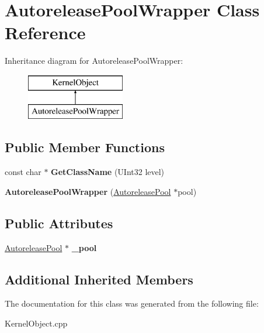 \hypertarget{class_autorelease_pool_wrapper}{}\section{Autorelease\+Pool\+Wrapper Class Reference}
\label{class_autorelease_pool_wrapper}
Inheritance diagram for Autorelease\+Pool\+Wrapper\+:\begin{figure}[H]
\begin{center}
\leavevmode
\includegraphics[height=2.000000cm]{class_autorelease_pool_wrapper}
\end{center}
\end{figure}
\subsection*{Public Member Functions}
\begin{DoxyCompactItemize}
\item 
\mbox{\label{class_autorelease_pool_wrapper_a86606ece5fe2c12375f38b61c9dcd269}} 
const char $\ast$ {\bfseries Get\+Class\+Name} (U\+Int32 level)
\item 
\mbox{\label{class_autorelease_pool_wrapper_af78d131c8973ae5aae7e6ef1d6d91b4c}} 
{\bfseries Autorelease\+Pool\+Wrapper} (\hyperlink{class_autorelease_pool}{Autorelease\+Pool} $\ast$pool)
\end{DoxyCompactItemize}
\subsection*{Public Attributes}
\begin{DoxyCompactItemize}
\item 
\mbox{\label{class_autorelease_pool_wrapper_a3ab16bc786d4319afbb09817b3d15a1c}} 
\hyperlink{class_autorelease_pool}{Autorelease\+Pool} $\ast$ {\bfseries \+\_\+pool}
\end{DoxyCompactItemize}
\subsection*{Additional Inherited Members}


The documentation for this class was generated from the following file\+:\begin{DoxyCompactItemize}
\item 
Kernel\+Object.\+cpp\end{DoxyCompactItemize}
